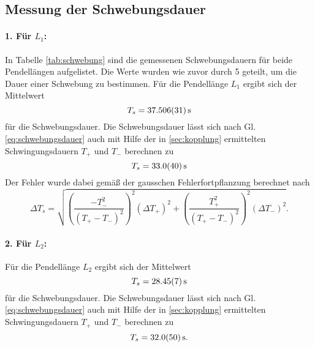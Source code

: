 \subsection{Messung der Schwebungsdauer}



\paragraph{1. Für $L_1$: }
In Tabelle \ref{tab:schwebung} sind die gemessenen Schwebungsdauern für beide Pendellängen aufgelistet. Die Werte wurden wie zuvor durch 5 geteilt, um die Dauer einer Schwebung zu bestimmen.
Für die Pendellänge $L_1$ ergibt sich der Mittelwert
\begin{equation}
    T_s = \SI{37.506 +- 0.031}{s}
\end{equation}
für die Schwebungsdauer.
Die Schwebungsdauer lässt sich nach Gl.\eqref{eq:schwebungsdauer} auch mit Hilfe der in \ref{sec:kopplung} ermittelten Schwingungsdauern $T_+$ und $T_-$ berechnen zu
\begin{equation}
    T_s = \SI{33.0 +- 4.0}{s}
\end{equation}
Der Fehler wurde dabei gemäß der gausschen Fehlerfortpflanzung berechnet nach
\begin{equation}
    \Delta T_s = \sqrt{ \left( \frac{- T_-^2}{(T_+-T_-)^2} \right)^2 (\Delta T_+)^2 + \left( \frac{T_+^2}{ (T_+ - T_- )^2}  \right)^2 (\Delta T_-)^2 } .
\end{equation}

\paragraph{2. Für $L_2$: }
Für die Pendellänge $L_2$ ergibt sich der Mittelwert
\begin{equation}
    T_s = \SI{28.45 +- 0.07}{s}
\end{equation}
für die Schwebungsdauer.
Die Schwebungsdauer lässt sich nach Gl.\eqref{eq:schwebungsdauer} auch mit Hilfe der in \ref{sec:kopplung} ermittelten Schwingungsdauern $T_+$ und $T_-$ berechnen zu
\begin{equation}
    T_s = \SI{32.0 +- 5.0}{s} .
\end{equation}